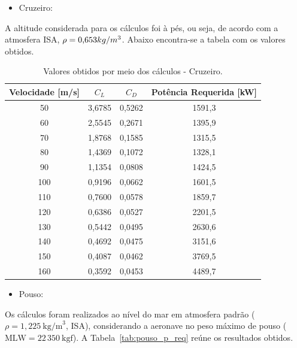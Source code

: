 \begin{itemize}
    \item{Cruzeiro:}
\end{itemize}

A altitude considerada para os cálculos foi à  pés, ou seja, de acordo com a atmosfera ISA, $\rho = \text{0,653} \space kg/m^3$. Abaixo encontra-se a tabela com os valores obtidos.

\begin{table}[H]
\centering
\caption{Valores obtidos por meio dos cálculos - Cruzeiro.}
\begin{tabular}{c c c c}
\hline
Velocidade [m/s] & $C_L$ & $C_D$ & Potência Requerida [kW] \\
\hline
50 & 3{,}6785 & 0{,}5262 & 1591{,}3 \\
60 & 2{,}5545 & 0{,}2671 & 1395{,}9 \\
70 & 1{,}8768 & 0{,}1585 & 1315{,}5 \\
80 & 1{,}4369 & 0{,}1072 & 1328{,}1 \\
90 & 1{,}1354 & 0{,}0808 & 1424{,}5 \\
100 & 0{,}9196 & 0{,}0662 & 1601{,}5 \\
110 & 0{,}7600 & 0{,}0578 & 1859{,}7 \\
120 & 0{,}6386 & 0{,}0527 & 2201{,}5 \\
130 & 0{,}5442 & 0{,}0495 & 2630{,}6 \\
140 & 0{,}4692 & 0{,}0475 & 3151{,}6 \\
150 & 0{,}4087 & 0{,}0462 & 3769{,}5 \\
160 & 0{,}3592 & 0{,}0453 & 4489{,}7 \\
\hline
\end{tabular}
\end{table}


\begin{itemize}
    \item{Pouso:}
\end{itemize}

Os cálculos foram realizados ao nível do mar em atmosfera padrão ($\rho = 1{,}225~\text{kg/m}^3$, ISA), considerando a aeronave no peso máximo de pouso ($\text{MLW} = 22\,350~\text{kgf}$). A Tabela~\ref{tab:pouso_p_req} reúne os resultados obtidos.

